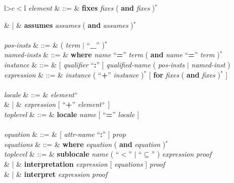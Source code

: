 \begin{isabellebody}
\begin{isamarkuptext}
\begin{table}
\begin{center}
\begin{tabular}{l>$c<$l}
  \textit{element} & ::=
  & \textbf{fixes} \textit{fixes} ( \textbf{and} \textit{fixes} )$^*$ \\
\begin{comment}
  & |
  & \textbf{constrains} \textit{constrains}
    ( \textbf{and} \textit{constrains} )$^*$ \\
\end{comment}
  & |
  & \textbf{assumes} \textit{assumes} ( \textbf{and} \textit{assumes} )$^*$ \\[2ex]

   \\

  \textit{pos-insts} & ::=
  & ( \textit{term} $|$ ``\textbf{\_}'' )$^*$ \\
  \textit{named-insts} & ::=
  & \textbf{where} \textit{name} ``\textbf{=}'' \textit{term}
  ( \textbf{and} \textit{name} ``\textbf{=}'' \textit{term} )$^*$ \\
  \textit{instance} & ::=
  & [ \textit{qualifier} ``\textbf{:}'' ]
    \textit{qualified-name} ( \textit{pos-insts} $|$ \textit{named-inst} ) \\
  \textit{expression}  & ::= 
  & \textit{instance} ( ``\textbf{+}'' \textit{instance} )$^*$
    [ \textbf{for} \textit{fixes} ( \textbf{and} \textit{fixes} )$^*$ ] \\[2ex]

   \\

  \textit{locale} & ::=
  & \textit{element}$^+$ \\
  & | & \textit{expression} [ ``\textbf{+}'' \textit{element}$^+$ ] \\
  \textit{toplevel} & ::=
  & \textbf{locale} \textit{name} [ ``\textbf{=}''
    \textit{locale} ] \\[2ex]

   \\

  \textit{equation} & ::= & [ \textit{attr-name} ``\textbf{:}'' ]
    \textit{prop} \\
  \textit{equations} & ::= &  \textbf{where} \textit{equation} ( \textbf{and}
    \textit{equation} )$^*$  \\
  \textit{toplevel} & ::=
  & \textbf{sublocale} \textit{name} ( ``$<$'' $|$
    ``$\subseteq$'' ) \textit{expression} \textit{proof} \\
  & |
  & \textbf{interpretation}
    \textit{expression} [ \textit{equations} ] \textit{proof} \\
  & |
  & \textbf{interpret}
    \textit{expression} \textit{proof} \\[2ex]


\end{tabular}
\end{center}
\end{table}
\end{isamarkuptext}
\end{isabellebody}
